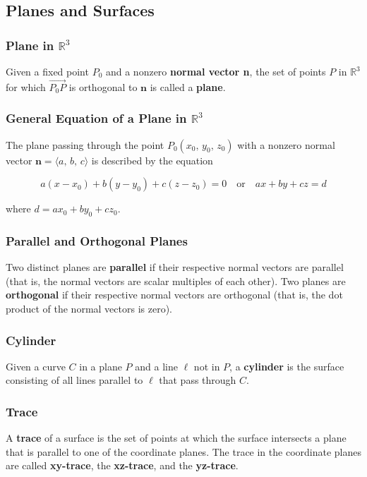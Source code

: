 \subsection{Planes and Surfaces}
\subsubsection{Plane in $\mathbb{R}^3$}
Given a fixed point $P_0$ and a nonzero \textbf{normal vector n}, the set of points $P$ in $\mathbb{R}^3$ for which $\vec{P_0 P}$ is orthogonal to $\mathbf{n}$ is called a \textbf{plane}.

\subsubsection{General Equation of a Plane in $\mathbb{R}^3$}
The plane passing through the point $P_0 (x_0,\, y_0,\, z_0)$ with a nonzero normal vector $\mathbf{n} = \langle a,\, b,\, c \rangle$ is described by the equation

\begin{equation}
    a(x - x_0) + b(y - y_0) + c(z - z_0) = 0 \quad \text{or} \quad ax + by + cz = d
\end{equation}

where $d = ax_0 + by_0 + cz_0$.

\subsubsection{Parallel and Orthogonal Planes}
Two distinct planes are \textbf{parallel} if their respective normal vectors are parallel (that is, the normal vectors are scalar multiples of each other). Two planes are \textbf{orthogonal} if their respective normal vectors are orthogonal (that is, the dot product of the normal vectors is zero).

\subsubsection{Cylinder}
Given a curve $C$ in a plane $P$ and a line $\ell$ not in $P$, a \textbf{cylinder} is the surface consisting of all lines parallel to $\ell$ that pass through $C$.

\subsubsection{Trace}
A \textbf{trace} of a surface is the set of points at which the surface intersects a plane that is parallel to one of the coordinate planes. The trace in the coordinate planes are called \textbf{xy-trace}, the \textbf{xz-trace}, and the \textbf{yz-trace}.

